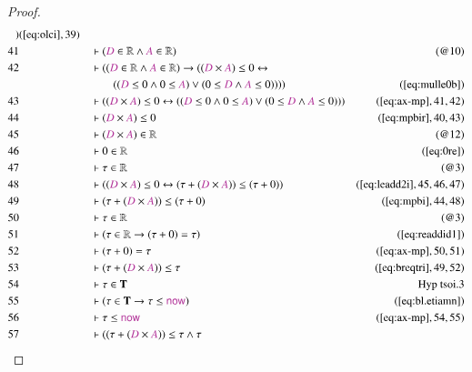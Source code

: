 \begin{proof}
\begin{align}
      )&(\mbox{\ref{eq:olci}},39)\notag
  \\ 41 &&  & \vdash ( \mc{D} \in \mathbb{R} \wedge \mc{A} \in \mathbb{R}
      )&(@10)\notag
  \\ 42 &&  & \vdash ( ( \mc{D} \in \mathbb{R} \wedge \mc{A} \in \mathbb{R} )
      \rightarrow ( ( \mc{D} \times \mc{A} ) \le 0
      \leftrightarrow  \notag \\ & & & \qquad
      ( ( \mc{D} \le 0 \wedge 0 \le \mc{A}
      ) \vee ( 0 \le \mc{D} \wedge \mc{A} \le 0 ) ) )
      )&(\mbox{\ref{eq:mulle0b}})\notag
  \\ 43 &&  & \vdash ( ( \mc{D} \times \mc{A} ) \le 0 \leftrightarrow ( ( \mc{D}
      \le 0 \wedge 0 \le \mc{A} ) \vee ( 0 \le \mc{D}
      \wedge \mc{A} \le 0 ) )
      )&(\mbox{\ref{eq:ax-mp}},41,42)\notag
  \\ 44 &&  & \vdash ( \mc{D} \times \mc{A} ) \le
      0&(\mbox{\ref{eq:mpbir}},40,43)\notag
  \\ 45 &&  & \vdash ( \mc{D} \times \mc{A} ) \in \mathbb{R}&(@12)\notag
  \\ 46 &&  & \vdash 0 \in \mathbb{R}&(\mbox{\ref{eq:0re}})\notag
  \\ 47 &&  & \vdash \tau \in \mathbb{R}&(@3)\notag
  \\ 48 &&  & \vdash ( ( \mc{D} \times \mc{A} ) \le 0 \leftrightarrow ( \tau + (
      \mc{D} \times \mc{A} ) ) \le ( \tau + 0 )
      )&(\mbox{\ref{eq:leadd2i}},45,46,47)\notag
  \\ 49 &&  & \vdash ( \tau + ( \mc{D} \times \mc{A} ) ) \le ( \tau + 0
      )&(\mbox{\ref{eq:mpbi}},44,48)\notag
  \\ 50 &&  & \vdash \tau \in \mathbb{R}&(@3)\notag
  \\ 51 &&  & \vdash ( \tau \in \mathbb{R} \rightarrow ( \tau + 0 ) = \tau
      )&(\mbox{\ref{eq:readdid1}})\notag
  \\ 52 &&  & \vdash ( \tau + 0 ) = \tau&(\mbox{\ref{eq:ax-mp}},50,51)\notag
  \\ 53 &&  & \vdash ( \tau + ( \mc{D} \times \mc{A} ) ) \le
      \tau&(\mbox{\ref{eq:breqtri}},49,52)\notag
  \\ 54 &&  & \vdash \tau \in \mathbf{T}&\text{Hyp~tsoi.3}\notag%
  \\ 55 &&  & \vdash ( \tau \in \mathbf{T} \rightarrow \tau \le
      \mathsf{\mc{now}} )&(\mbox{\ref{eq:bl.etiamn}})\notag
  \\ 56 &&  & \vdash \tau \le
      \mathsf{\mc{now}}&(\mbox{\ref{eq:ax-mp}},54,55)\notag
  \\ 57 &&  & \vdash ( ( \tau + ( \mc{D} \times \mc{A} ) ) \le \tau \wedge \tau

\end{align}
\end{proof}
